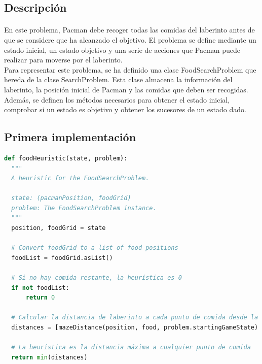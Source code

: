 \documentclass{report}
\begin{document}
        \subsection*{Descripción}
          \paragraph*{}{
            En este problema, Pacman debe recoger todas las comidas del laberinto antes de que se considere que ha alcanzado el objetivo. El problema se define mediante un estado inicial, un estado objetivo y una serie de acciones que Pacman puede realizar para moverse por el laberinto.\\
            Para representar este problema, se ha definido una clase FoodSearchProblem que hereda de la clase SearchProblem. Esta clase almacena la información del laberinto, la posición inicial de Pacman y las comidas que deben ser recogidas. Además, se definen los métodos necesarios para obtener el estado inicial, comprobar si un estado es objetivo y obtener los sucesores de un estado dado.\\
          }
        \subsection*{Primera implementación}
          \begin{lstlisting}[language=Python, caption=Implementación inicial de la heurística del problema de las esquinas]
def foodHeuristic(state, problem):
  """
  A heuristic for the FoodSearchProblem.
  
  state: (pacmanPosition, foodGrid)
  problem: The FoodSearchProblem instance.
  """
  position, foodGrid = state

  # Convert foodGrid to a list of food positions
  foodList = foodGrid.asList()

  # Si no hay comida restante, la heurística es 0
  if not foodList:
      return 0

  # Calcular la distancia de laberinto a cada punto de comida desde la posición actual de Pacman
  distances = [mazeDistance(position, food, problem.startingGameState) for food in foodList]

  # La heurística es la distancia máxima a cualquier punto de comida
  return min(distances)
          \end{lstlisting}
\end{document}

